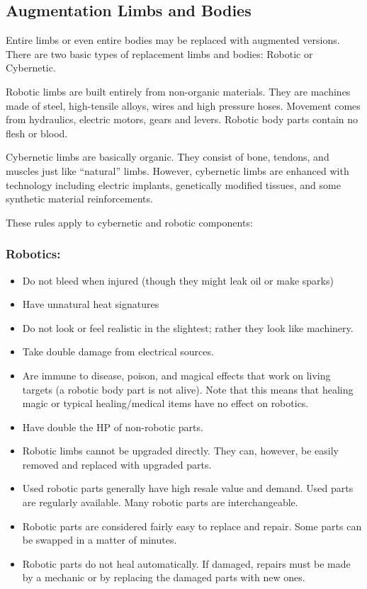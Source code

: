\subsection{Augmentation Limbs and Bodies}

Entire limbs or even entire bodies may be replaced with augmented versions.  
There are two basic types of replacement limbs and bodies: Robotic or Cybernetic.

Robotic limbs are built entirely from non-organic materials.  They are machines
made of steel, high-tensile alloys, wires and high pressure hoses.  Movement 
comes from hydraulics, electric motors, gears and levers.  Robotic body parts 
contain no flesh or blood.

Cybernetic limbs are basically organic.  They consist of bone, tendons, and 
muscles just like ``natural'' limbs.  However, cybernetic limbs are enhanced 
with technology including electric implants, genetically modified tissues, 
and some synthetic material reinforcements.

These rules apply to cybernetic and robotic components:

\subsubsection{Robotics:}
\begin{itemize}
\item Do not bleed when injured (though they might leak oil or make sparks)
\item Have unnatural heat signatures
\item Do not look or feel realistic in the slightest; rather they look 
like machinery.
\item Take double damage from electrical sources.
\item Are immune to disease, poison, and magical effects that work on 
living targets (a robotic body part is not alive).  Note that this 
means that healing magic or typical healing/medical items have no effect on robotics.
\item Have double the HP of non-robotic parts.
\item Robotic limbs cannot be upgraded directly.  They can, however, be 
easily removed and replaced with upgraded parts.
\item Used robotic parts generally have high resale value and demand.
Used parts are regularly available.  Many robotic parts are interchangeable.
\item Robotic parts are considered fairly easy to replace and repair.  
Some parts can be swapped in a matter of minutes.
\item Robotic parts do not heal automatically.  If damaged, repairs must be
made by a mechanic or by replacing the damaged parts with new ones.
\end{itemize}

